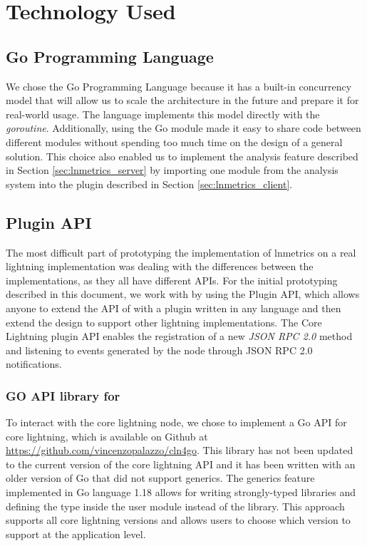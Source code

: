 \chapter{Technology Used}\label{chap:tech}

\section{Go Programming Language}

We chose the Go Programming Language because it has a built-in concurrency model that will allow 
us to scale the architecture in the future and prepare it for real-world usage. 
The language implements this model directly with the \emph{goroutine}. Additionally,
using the Go module made it easy to share code between different modules 
without spending too much time on the design of a general solution. 
This choice also enabled us to implement the analysis feature described in Section \ref{sec:lnmetrics_server} 
by importing one module from the analysis system into the plugin described in Section \ref{sec:lnmetrics_client}.

\section{{\CLN} Plugin API}

The most difficult part of prototyping the implementation of lnmetrics on a real 
lightning implementation was dealing with the differences between the implementations, 
as they all have different APIs. For the initial prototyping described in this document,
we work with {\CLN} by using the {\CLN} Plugin API, which allows 
anyone to extend the API of {\CLN} with a plugin written in any language and then
extend the design to support other lightning implementations.
The Core Lightning plugin API enables the registration 
of a new \emph{JSON RPC 2.0}\cite{jsonrpc} method and listening to 
events generated by the node through JSON RPC 2.0 notifications.

\subsection{GO API library for {\CLN}}

To interact with the core lightning node, we chose to implement a Go API for core 
lightning, which is available on Github at \url{https://github.com/vincenzopalazzo/cln4go}. 
This library has not been updated to the current version of the core lightning 
API and it has been written with an older version of Go that did not support generics. 
The generics feature implemented in Go language 1.18 allows for writing 
strongly-typed libraries and defining the type inside the user module instead of the library. 
This approach supports all core lightning versions and allows users to choose 
which version to support at the application level.

